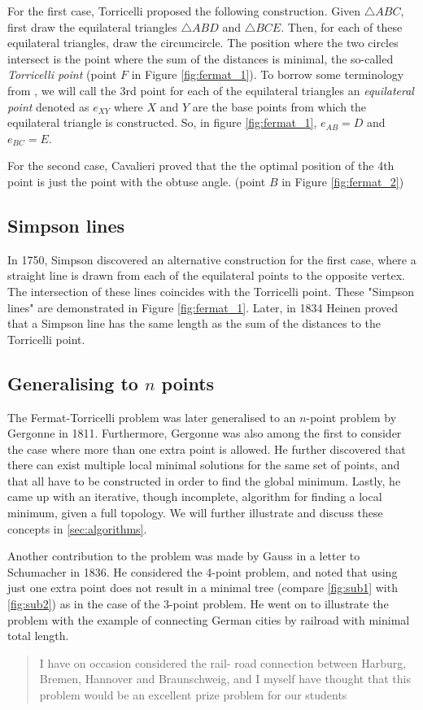 \documentclass{l4proj}
\begin{document}
For the first case, Torricelli proposed the following construction. Given $\triangle ABC$, first draw the equilateral triangles $\triangle ABD$ and $\triangle BCE$. Then, for each of these equilateral triangles, draw the circumcircle. The position where the two circles intersect is the point where the sum of the distances is minimal, the so-called \textit{Torricelli point} (point $F$ in Figure \ref{fig:fermat_1}).
To borrow some terminology from \cite{geosteiner96}, we will call the 3rd point for each of the equilateral triangles an \textit{equilateral point} denoted as $e_{XY}$ where $X$ and $Y$ are the base points from which the equilateral triangle is constructed. So, in figure \ref{fig:fermat_1}, $e_{AB} = D$ and $e_{BC} = E$.

For the second case, Cavalieri proved that the the optimal position of the 4th point is just the point with the obtuse angle. (point $B$ in Figure \ref{fig:fermat_2})

\subsection{Simpson lines}
In 1750, Simpson discovered an alternative construction for the first case, where a straight line is drawn from each of the equilateral points to the opposite vertex. The intersection of these lines coincides with the Torricelli point. These "Simpson lines" are demonstrated in Figure \ref{fig:fermat_1}.
Later, in 1834 Heinen proved that a Simpson line has the same length as the sum of the distances to the Torricelli point.

\subsection{Generalising to $n$ points}
\label{sec:gergonne}
The Fermat-Torricelli problem was later generalised to an $n$-point problem by Gergonne in 1811. Furthermore, Gergonne was also among the first to consider the case where more than one extra point is allowed. He further discovered that there can exist multiple local minimal solutions for the same set of points, and that all have to be constructed in order to find the global minimum. Lastly, he came up with an iterative, though incomplete, algorithm for finding a local minimum, given a full topology. We will further illustrate and discuss these concepts in \ref{sec:algorithms}.

Another contribution to the problem was made by Gauss in a letter to Schumacher in 1836. He considered the 4-point problem, and noted that using just one extra point does not result in a minimal tree (compare \ref{fig:sub1} with \ref{fig:sub2}) as in the case of the 3-point problem. He went on to illustrate the problem with the example of connecting German cities by railroad with minimal total length.
\begin{quote}
    I have on occasion considered the rail- road connection between Harburg, Bremen, Hannover and Braunschweig, and I myself have thought that this problem would be an excellent prize problem for our students
\end{quote}
\end{document}
